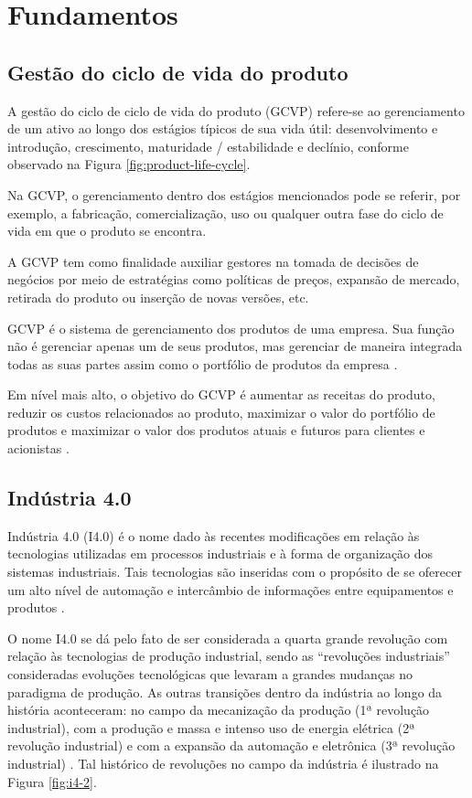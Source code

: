 \chapter{Fundamentos}

\section{Gestão do ciclo de vida do produto}

	A gestão do ciclo de ciclo de vida do produto (GCVP) refere-se ao gerenciamento de um ativo ao longo dos estágios típicos de sua vida útil: desenvolvimento e introdução, crescimento, maturidade / estabilidade e declínio, conforme observado na Figura \ref{fig:product-life-cycle}. 
	
	Na GCVP, o gerenciamento dentro dos estágios mencionados pode se referir, por exemplo, a fabricação, comercialização, uso ou qualquer outra fase do ciclo de vida em que o produto se encontra. 
	
	A GCVP tem como finalidade auxiliar gestores na tomada de decisões de negócios por meio de estratégias como políticas de preços, expansão de mercado, retirada do produto ou inserção de novas versões, etc.
	
	GCVP é o sistema de gerenciamento dos produtos de uma empresa. Sua função não é gerenciar apenas um de seus produtos, mas gerenciar de maneira integrada todas as suas partes assim como o portfólio de produtos da empresa \cite{stark2015lifecycle}.
	
	Em nível mais alto, o objetivo do GCVP é aumentar as receitas do produto, reduzir os custos relacionados ao produto, maximizar o valor do portfólio de produtos e maximizar o valor dos produtos atuais e futuros para clientes e acionistas \cite{stark2015lifecycle}.

\section{Indústria 4.0}

	Indústria 4.0 (I4.0) é o nome dado às recentes modificações em relação às tecnologias utilizadas em processos industriais e à forma de organização dos sistemas industriais. Tais tecnologias são inseridas com o propósito de se oferecer um alto nível de automação e intercâmbio de informações entre equipamentos e produtos \cite{lasi2014industryfour}.

	O nome I4.0 se dá pelo fato de ser considerada a quarta grande revolução com relação às tecnologias de produção industrial, sendo as ``revoluções industriais'' consideradas evoluções tecnológicas que levaram a grandes mudanças no paradigma de produção. As outras transições dentro da indústria ao longo da história aconteceram: no campo da mecanização da produção (1ª revolução industrial), com a produção e massa e intenso uso de energia elétrica (2ª revolução industrial) e com a expansão da automação e eletrônica (3ª revolução industrial) \cite{lasi2014industryfour}. Tal histórico de revoluções no campo da indústria é ilustrado na Figura \ref{fig:i4-2}.

